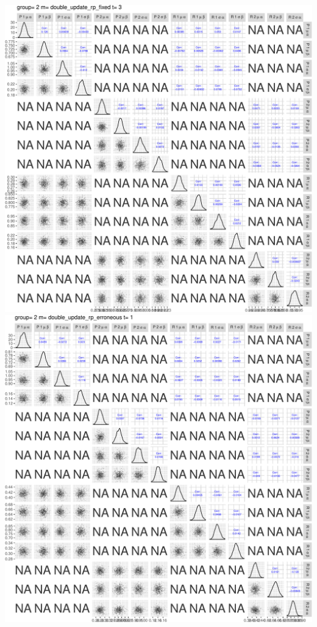 \documentclass[]{article}
\begin{document}
\includegraphics{compare_models_files/figure-latex/PairsPlots-6.pdf}
\includegraphics{compare_models_files/figure-latex/PairsPlots-7.pdf}
\end{document}
